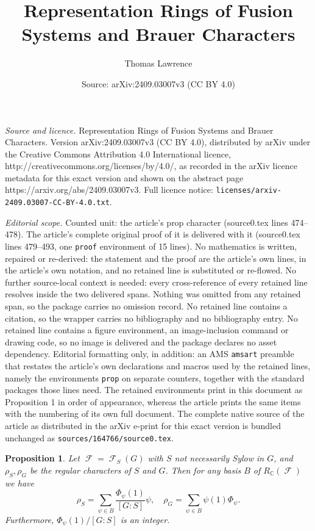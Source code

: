 \documentclass[10pt,a4paper]{amsart}
\title{Representation Rings of Fusion Systems and Brauer Characters}
\author{Thomas Lawrence}
\date{Source: arXiv:2409.03007v3 (CC BY 4.0)}
\newtheorem{prop}{Proposition}
\DeclareMathOperator{\C}{\mathbb{C}}
\DeclareMathOperator{\sF}{\mathcal{F}}
\begin{document}
\maketitle

\noindent\emph{Source and licence.} Representation Rings of Fusion Systems and Brauer Characters. Version arXiv:2409.03007v3 (CC BY 4.0), distributed by arXiv under the Creative Commons Attribution 4.0 International licence, http://creativecommons.org/licenses/by/4.0/, as recorded in the arXiv licence metadata for this exact version and shown on the abstract page https://arxiv.org/abs/2409.03007v3. Full licence notice: \texttt{licenses/arxiv-2409.03007-CC-BY-4.0.txt}.\par\smallskip

\noindent\textit{Editorial scope.} Counted unit: the article's prop character (source0.tex lines 474--478). The article's complete original proof of it is delivered with it (source0.tex lines 479--493, one \texttt{proof} environment of 15 lines). No mathematics is written, repaired or re-derived: the statement and the proof are the article's own lines, in the article's own notation, and no retained line is substituted or re-flowed.  No further source-local context is needed: every cross-reference of every retained line resolves inside the two delivered spans.  Nothing was omitted from any retained span, so the package carries no omission record.  No retained line contains a citation, so the wrapper carries no bibliography and no bibliography entry.  No retained line contains a figure environment, an image-inclusion command or drawing code, so no image is delivered and the package declares no asset dependency.  Editorial formatting only, in addition: an AMS \texttt{amsart} preamble that restates the article's own declarations and macros used by the retained lines, namely the environments \texttt{prop} on separate counters, together with the standard packages those lines need.  The retained environments print in this document as Proposition 1 in order of appearance, whereas the article prints the same items with the numbering of its own full document.  The complete native source of the article as distributed in the arXiv e-print for this exact version is bundled unchanged as \texttt{sources/164766/source0.tex}.
\begin{prop}\label{regular character}
Let $\sF = \sF_S(G)$ with $S$ not necessarily Sylow in $G$, and $\rho_S, \rho_G$ be the regular characters of $S$ and $G$. Then for any basis $B$ of $R_{\C}(\sF)$ we have
\[\rho_S = \sum_{\psi \in B} \frac{\Phi_{\psi}(1)}{[G:S]}\psi, \quad \rho_G = \sum_{\psi \in B} \psi(1)\Phi_{\psi}.\]
Furthermore, $\Phi_{\psi}(1)/[G:S]$ is an integer.
\end{prop}
\end{document}
